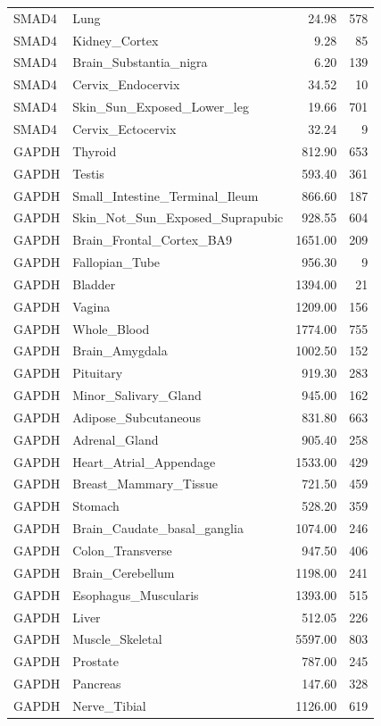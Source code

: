 \begin{footnotesize}
\begin{longtable}{llrr}
SMAD4 & Lung & 24.98 & 578 \\
SMAD4 & Kidney\_Cortex & 9.28 & 85 \\
SMAD4 & Brain\_Substantia\_nigra & 6.20 & 139 \\
SMAD4 & Cervix\_Endocervix & 34.52 & 10 \\
SMAD4 & Skin\_Sun\_Exposed\_Lower\_leg & 19.66 & 701 \\
SMAD4 & Cervix\_Ectocervix & 32.24 & 9 \\
GAPDH & Thyroid & 812.90 & 653 \\
GAPDH & Testis & 593.40 & 361 \\
GAPDH & Small\_Intestine\_Terminal\_Ileum & 866.60 & 187 \\
GAPDH & Skin\_Not\_Sun\_Exposed\_Suprapubic & 928.55 & 604 \\
GAPDH & Brain\_Frontal\_Cortex\_BA9 & 1651.00 & 209 \\
GAPDH & Fallopian\_Tube & 956.30 & 9 \\
GAPDH & Bladder & 1394.00 & 21 \\
GAPDH & Vagina & 1209.00 & 156 \\
GAPDH & Whole\_Blood & 1774.00 & 755 \\
GAPDH & Brain\_Amygdala & 1002.50 & 152 \\
GAPDH & Pituitary & 919.30 & 283 \\
GAPDH & Minor\_Salivary\_Gland & 945.00 & 162 \\
GAPDH & Adipose\_Subcutaneous & 831.80 & 663 \\
GAPDH & Adrenal\_Gland & 905.40 & 258 \\
GAPDH & Heart\_Atrial\_Appendage & 1533.00 & 429 \\
GAPDH & Breast\_Mammary\_Tissue & 721.50 & 459 \\
GAPDH & Stomach & 528.20 & 359 \\
GAPDH & Brain\_Caudate\_basal\_ganglia & 1074.00 & 246 \\
GAPDH & Colon\_Transverse & 947.50 & 406 \\
GAPDH & Brain\_Cerebellum & 1198.00 & 241 \\
GAPDH & Esophagus\_Muscularis & 1393.00 & 515 \\
GAPDH & Liver & 512.05 & 226 \\
GAPDH & Muscle\_Skeletal & 5597.00 & 803 \\
GAPDH & Prostate & 787.00 & 245 \\
GAPDH & Pancreas & 147.60 & 328 \\
GAPDH & Nerve\_Tibial & 1126.00 & 619 \\

\end{longtable}
\end{footnotesize}
